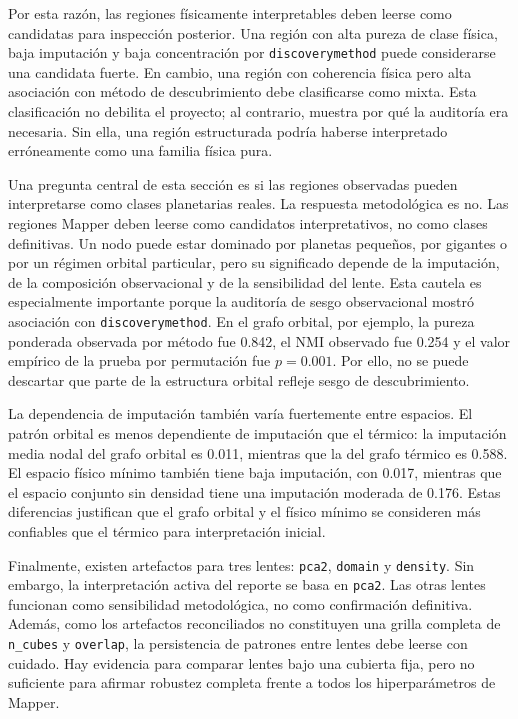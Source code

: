 Por esta razón, las regiones físicamente interpretables deben leerse como candidatas para inspección posterior. Una región con alta pureza de clase física, baja imputación y baja concentración por \texttt{discoverymethod} puede considerarse una candidata fuerte. En cambio, una región con coherencia física pero alta asociación con método de descubrimiento debe clasificarse como mixta. Esta clasificación no debilita el proyecto; al contrario, muestra por qué la auditoría era necesaria. Sin ella, una región estructurada podría haberse interpretado erróneamente como una familia física pura.

Una pregunta central de esta sección es si las regiones observadas pueden interpretarse como clases planetarias reales. La respuesta metodológica es no. Las regiones Mapper deben leerse como candidatos interpretativos, no como clases definitivas. Un nodo puede estar dominado por planetas pequeños, por gigantes o por un régimen orbital particular, pero su significado depende de la imputación, de la composición observacional y de la sensibilidad del lente. Esta cautela es especialmente importante porque la auditoría de sesgo observacional mostró asociación con \texttt{discoverymethod}. En el grafo orbital, por ejemplo, la pureza ponderada observada por método fue 0.842, el NMI observado fue 0.254 y el valor empírico de la prueba por permutación fue \(p=0.001\). Por ello, no se puede descartar que parte de la estructura orbital refleje sesgo de descubrimiento.

La dependencia de imputación también varía fuertemente entre espacios. El patrón orbital es menos dependiente de imputación que el térmico: la imputación media nodal del grafo orbital es 0.011, mientras que la del grafo térmico es 0.588. El espacio físico mínimo también tiene baja imputación, con 0.017, mientras que el espacio conjunto sin densidad tiene una imputación moderada de 0.176. Estas diferencias justifican que el grafo orbital y el físico mínimo se consideren más confiables que el térmico para interpretación inicial.

Finalmente, existen artefactos para tres lentes: \texttt{pca2}, \texttt{domain} y \texttt{density}. Sin embargo, la interpretación activa del reporte se basa en \texttt{pca2}. Las otras lentes funcionan como sensibilidad metodológica, no como confirmación definitiva. Además, como los artefactos reconciliados no constituyen una grilla completa de \texttt{n\_cubes} y \texttt{overlap}, la persistencia de patrones entre lentes debe leerse con cuidado. Hay evidencia para comparar lentes bajo una cubierta fija, pero no suficiente para afirmar robustez completa frente a todos los hiperparámetros de Mapper.

